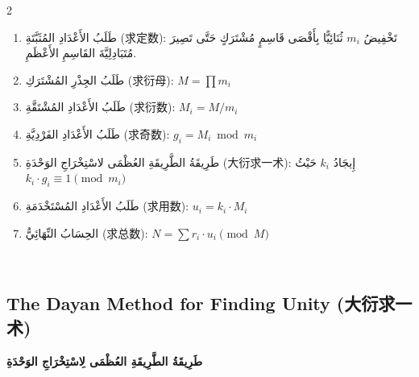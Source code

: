 \documentclass[11pt,a4paper]{article}
\newcommand{\ar}[1]{\arabicfont\beginR #1\endR}
\newcommand{\zhtext}[1]{{\chinese #1}}
\newenvironment{bilingual}{%
  \begin{paracol}{2}
}{%
  \end{paracol}
}
\begin{document}
\begin{bilingual}
\begin{rightcolumn*}
\begin{enumerate}[label=\ar{خُطْوَةُ} \arabic*.\ar{:}]
  \item \ar{طَلَبُ الأَعْدَادِ المُثَبَّتَةِ (求定数): تَخْفِيضُ $m_i$ ثُنَائِيًّا بِأَقْصَى قَاسِمٍ مُشْتَرَكٍ حَتَّى تَصِيرَ مُتَبَادِلِيَّةَ القَاسِمِ الأَعْظَمِ.}
  \item \ar{طَلَبُ الجِذْرِ المُشْتَرَكِ (求衍母): $M = \prod m_i$}
  \item \ar{طَلَبُ الأَعْدَادِ المُشْتَقَّةِ (求衍数): $M_i = M / m_i$}
  \item \ar{طَلَبُ الأَعْدَادِ الفَرْدِيَّةِ (求奇数): $g_i = M_i \bmod m_i$}
  \item \ar{طَرِيقَةُ الطَّرِيقَةِ العُظْمَى لاسْتِخْرَاجِ الوَحْدَةِ (大衍求一术): إِيجَادُ $k_i$ حَيْثُ $k_i \cdot g_i \equiv 1 \pmod{m_i}$}
  \item \ar{طَلَبُ الأَعْدَادِ المُسْتَخْدَمَةِ (求用数): $u_i = k_i \cdot M_i$}
  \item \ar{الحِسَابُ النِّهَائِيُّ (求总数): $N = \sum r_i \cdot u_i \pmod{M}$}
\end{enumerate}
\end{rightcolumn*}
\begin{leftcolumn*}
~ %
\end{leftcolumn*}
\end{bilingual}

\newpage

\subsection{The Dayan Method for Finding Unity (\zhtext{大衍求一术})}
\ar{\textbf{طَرِيقَةُ الطَّرِيقَةِ العُظْمَى لِاسْتِخْرَاجِ الوَحْدَةِ}}
\end{document}
